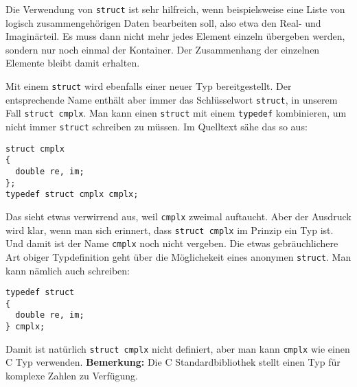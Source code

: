 Die Verwendung von \verb|struct| ist sehr hilfreich, wenn beispielsweise eine Liste von logisch zusammengehörigen Daten bearbeiten soll, also etwa den Real- und Imaginärteil.
Es muss dann nicht mehr jedes Element einzeln übergeben werden, sondern nur noch einmal der Kontainer.
Der Zusammenhang der einzelnen Elemente bleibt damit erhalten.

Mit einem \verb|struct| wird ebenfalls einer neuer Typ bereitgestellt.
Der entsprechende Name enthält aber immer das Schlüsselwort \verb|struct|, in unserem Fall \verb|struct cmplx|. 
Man kann einen \verb|struct| mit einem \verb|typedef| kombinieren, um nicht immer \verb|struct| schreiben zu müssen.
Im Quelltext sähe das so aus:
\begin{lstlisting}
struct cmplx
{
  double re, im;
};
typedef struct cmplx cmplx;
\end{lstlisting}
Das sieht etwas verwirrend aus, weil \verb|cmplx| zweimal auftaucht.
Aber der Ausdruck wird klar, wenn man sich erinnert, dass \verb|struct cmplx| im Prinzip ein Typ ist.
Und damit ist der Name \verb|cmplx| noch nicht vergeben.
Die etwas gebräuchlichere Art obiger Typdefinition geht über die Möglichekeit eines anonymen \verb|struct|.
Man kann nämlich auch schreiben:
\begin{lstlisting}
typedef struct
{
  double re, im;
} cmplx;
\end{lstlisting}
Damit ist natürlich \verb|struct cmplx| nicht definiert, aber man kann \verb|cmplx| wie einen C Typ verwenden.
\textbf{Bemerkung:} Die C Standardbibliothek stellt einen Typ für komplexe Zahlen zu Verfügung.

